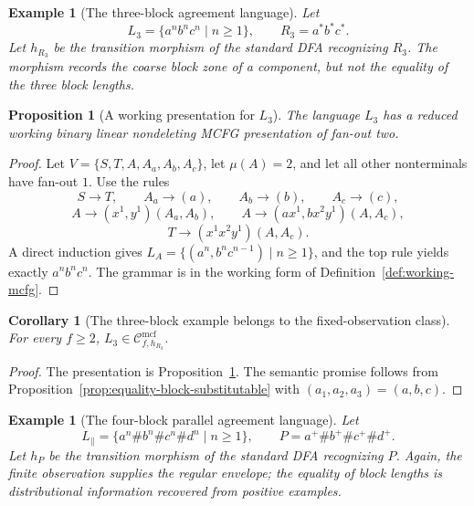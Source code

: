\documentclass[11pt,a4paper]{article}
\newtheorem{proposition}[theorem]{Proposition}
\newtheorem{corollary}[theorem]{Corollary}
\newtheorem{example}[theorem]{Example}
\theoremstyle{remark}
\newcommand{\Cmcf}[2]{\mathcal{C}^{\mathrm{mcf}}_{#1,#2}}
\begin{document}
\begin{example}[The three-block agreement language]
\label{ex:l3-language}
Let
\[
  L_3=\{a^n b^n c^n\mid n\ge1\},
  \qquad R_3=a^*b^*c^* .
\]
Let \(h_{R_3}\) be the transition morphism of the standard DFA recognizing
\(R_3\).  The morphism records the coarse block zone of a component, but not the
equality of the three block lengths.
\end{example}

\begin{proposition}[A working presentation for \(L_3\)]
\label{prop:l3-running-example}
The language \(L_3\) has a reduced working binary linear nondeleting MCFG
presentation of fan-out two.
\end{proposition}

\begin{proof}
Let \(V=\{S,T,A,A_a,A_b,A_c\}\), let \(\mu(A)=2\), and let all other
nonterminals have fan-out \(1\).  Use the rules
\[
  S\to T,\qquad A_a\to(a),\qquad A_b\to(b),\qquad A_c\to(c),
\]
\[
  A\to(x^1,y^1)(A_a,A_b),\qquad
  A\to(a x^1,b x^2 y^1)(A,A_c),
\]
\[
  T\to(x^1x^2y^1)(A,A_c).
\]
A direct induction gives
\(L_A=\{(a^n,b^n c^{n-1})\mid n\ge1\}\), and the top rule yields exactly
\(a^n b^n c^n\).  The grammar is in the working form of
Definition~\ref{def:working-mcfg}.
\end{proof}

\begin{corollary}[The three-block example belongs to the fixed-observation class]
\label{cor:l3-in-fixed-observation-class}
For every \(f\ge2\), \(L_3\in\Cmcf{f}{h_{R_3}}\).
\end{corollary}

\begin{proof}
The presentation is Proposition~\ref{prop:l3-running-example}.  The semantic
promise follows from Proposition~\ref{prop:equality-block-substitutable}
with \((a_1,a_2,a_3)=(a,b,c)\).
\end{proof}

\begin{example}[The four-block parallel agreement language]
\label{ex:parallel-language}
Let
\[
  L_{\parallel}=\{a^n\#b^n\#c^n\#d^n\mid n\ge1\},
  \qquad P=a^+\#b^+\#c^+\#d^+ .
\]
Let \(h_P\) be the transition morphism of the standard DFA recognizing \(P\).
Again, the finite observation supplies the regular envelope; the equality of
block lengths is distributional information recovered from positive examples.
\end{example}
\end{document}
